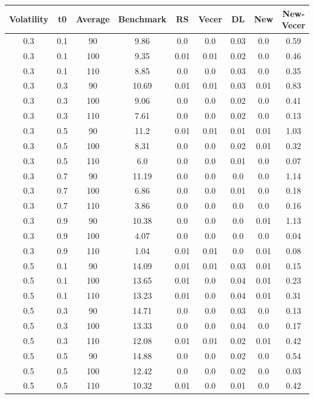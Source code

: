 \documentclass{article}
\begin{document}
\begin{table}[H]
  \begin{tabular}{|c|c|c|c|c|c|c|c|c|}
  \hline
  Volatility & t0 & Average & Benchmark & RS & Vecer & DL & New & New-Vecer \\
  \hline
  0.3 & 0.1 & 90 & 9.86 & 0.0 & 0.0 & 0.03 & 0.0 & 0.59 \\
  0.3 & 0.1 & 100 & 9.35 & 0.01 & 0.01 & 0.02 & 0.0 & 0.46 \\
  0.3 & 0.1 & 110 & 8.85 & 0.0 & 0.0 & 0.03 & 0.0 & 0.35 \\
  0.3 & 0.3 & 90 & 10.69 & 0.01 & 0.01 & 0.03 & 0.01 & 0.83 \\
  0.3 & 0.3 & 100 & 9.06 & 0.0 & 0.0 & 0.02 & 0.0 & 0.41 \\
  0.3 & 0.3 & 110 & 7.61 & 0.0 & 0.0 & 0.02 & 0.0 & 0.13 \\
  0.3 & 0.5 & 90 & 11.2 & 0.01 & 0.01 & 0.01 & 0.01 & 1.03 \\
  0.3 & 0.5 & 100 & 8.31 & 0.0 & 0.0 & 0.02 & 0.01 & 0.32 \\
  0.3 & 0.5 & 110 & 6.0 & 0.0 & 0.0 & 0.01 & 0.0 & 0.07 \\
  0.3 & 0.7 & 90 & 11.19 & 0.0 & 0.0 & 0.0 & 0.0 & 1.14 \\
  0.3 & 0.7 & 100 & 6.86 & 0.0 & 0.0 & 0.01 & 0.0 & 0.18 \\
  0.3 & 0.7 & 110 & 3.86 & 0.0 & 0.0 & 0.0 & 0.0 & 0.16 \\
  0.3 & 0.9 & 90 & 10.38 & 0.0 & 0.0 & 0.0 & 0.01 & 1.13 \\
  0.3 & 0.9 & 100 & 4.07 & 0.0 & 0.0 & 0.0 & 0.0 & 0.04 \\
  0.3 & 0.9 & 110 & 1.04 & 0.01 & 0.01 & 0.0 & 0.01 & 0.08 \\
  0.5 & 0.1 & 90 & 14.09 & 0.01 & 0.01 & 0.03 & 0.01 & 0.15 \\
  0.5 & 0.1 & 100 & 13.65 & 0.01 & 0.0 & 0.04 & 0.01 & 0.23 \\
  0.5 & 0.1 & 110 & 13.23 & 0.01 & 0.0 & 0.04 & 0.01 & 0.31 \\
  0.5 & 0.3 & 90 & 14.71 & 0.0 & 0.0 & 0.03 & 0.0 & 0.13 \\
  0.5 & 0.3 & 100 & 13.33 & 0.0 & 0.0 & 0.04 & 0.0 & 0.17 \\
  0.5 & 0.3 & 110 & 12.08 & 0.01 & 0.01 & 0.02 & 0.01 & 0.42 \\
  0.5 & 0.5 & 90 & 14.88 & 0.0 & 0.0 & 0.02 & 0.0 & 0.54 \\
  0.5 & 0.5 & 100 & 12.42 & 0.0 & 0.0 & 0.02 & 0.0 & 0.03 \\
  0.5 & 0.5 & 110 & 10.32 & 0.01 & 0.0 & 0.01 & 0.0 & 0.42 \\

\end{tabular}
\end{table}
\end{document}
